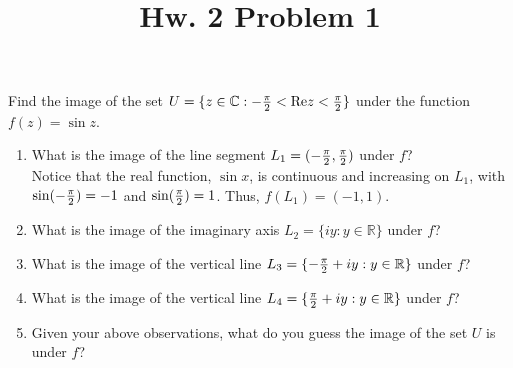\documentclass[12pt]{article}
\newcommand{\C}{\mathbb{C}}
\newcommand{\R}{\mathbb{R}}
\renewcommand{\Re}{\text{Re}}
\begin{document}
\title{Hw. 2 Problem 1}
\maketitle

Find the image of the set $U=\{z\in \C:-{\pi\over 2}<\Re z<{\pi\over 2}\}$ under the function $f(z)=\sin⁡ z$.

\begin{enumerate}
\item What is the image of the line segment $L_1=(-{\pi\over2},{\pi\over 2})$ under $f$?\\

Notice that the real function, $\sin x$, is continuous and increasing on $L_1$, with $\sin (-{\pi\over 2}) = -1$ and $\sin ({\pi\over 2}) = 1$. Thus, $f(L_1)=(-1,1)$.

\item What is the image of the imaginary axis $L_2=\{iy:y\in\R\}$ under $f$?
\item What is the image of the vertical line $L_3=\{-{\pi\over2}+iy:y\in\R\}$ under $f$?
\item What is the image of the vertical line $L_4=\{{\pi\over2}+iy:y\in\R\}$ under $f$?
\item Given your above observations, what do you guess the image of the set $U$ is under $f$?
\end{enumerate}
\end{document}
